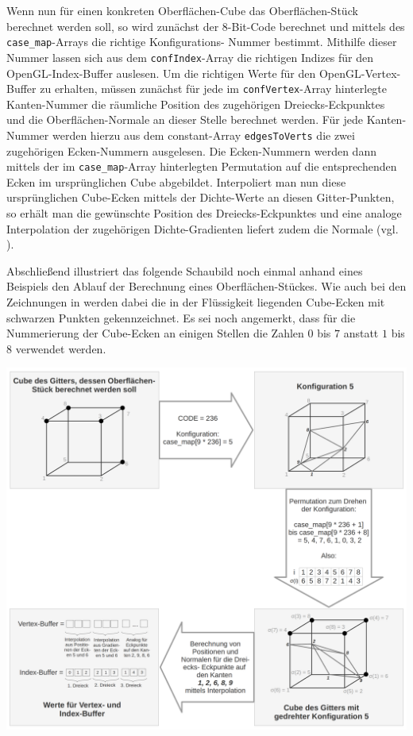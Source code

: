 \noindent Wenn nun für einen konkreten Oberflächen-Cube das Oberflächen-Stück berechnet werden soll, so wird zunächst der $8$-Bit-Code berechnet und mittels des {\tt case\_map}-Arrays die richtige Konfigurations-
Nummer bestimmt. Mithilfe dieser Nummer lassen sich aus dem {\tt confIndex}-Array die richtigen Indizes für den OpenGL-Index-Buffer auslesen. Um die richtigen Werte für den OpenGL-Vertex-Buffer zu erhalten, müssen zunächst für jede im {\tt confVertex}-Array hinterlegte Kanten-Nummer die räumliche Position des zugehörigen Dreiecks-Eckpunktes und die Oberflächen-Normale an dieser Stelle berechnet werden. Für jede Kanten-Nummer werden hierzu aus dem constant-Array {\tt edgesToVerts} die zwei zugehörigen Ecken-Nummern ausgelesen. Die Ecken-Nummern werden dann mittels der im {\tt case\_map}-Array hinterlegten Permutation auf die entsprechenden Ecken im ursprünglichen Cube abgebildet. Interpoliert man nun diese ursprünglichen Cube-Ecken mittels der Dichte-Werte an diesen Gitter-Punkten, so erhält man die gewünschte Position des Dreiecks-Eckpunktes und eine analoge Interpolation der zugehörigen Dichte-Gradienten liefert zudem die Normale (vgl. \cite[S. 165]{MC}).
\smallskip

\noindent Abschließend illustriert das folgende Schaubild noch einmal anhand eines Beispiels den Ablauf der Berechnung eines Oberflächen-Stückes. Wie auch bei den Zeichnungen in \cite[S. 165]{MC} werden dabei die in der Flüssigkeit liegenden Cube-Ecken mit schwarzen Punkten gekennzeichnet. Es sei noch angemerkt, dass für die Nummerierung der Cube-Ecken an einigen Stellen die Zahlen $0$ bis $7$ anstatt $1$ bis $8$ verwendet werden.
\medskip

\begin{center}
\includegraphics[scale=0.2]{images/Cube-Ablauf}
\end{center}
\newpage